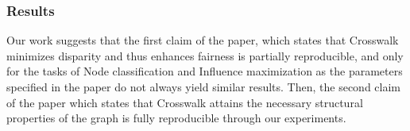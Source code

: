 
\subsubsection*{Results}
Our work suggests that the first claim of the paper, which states that Crosswalk minimizes disparity and thus enhances fairness is partially reproducible, and only for the tasks of Node classification and Influence maximization as the parameters specified in the paper do not always yield similar results. Then, the second claim of the paper which states that Crosswalk attains the necessary structural properties of the graph is fully reproducible through our experiments. \vspace{-1mm}





